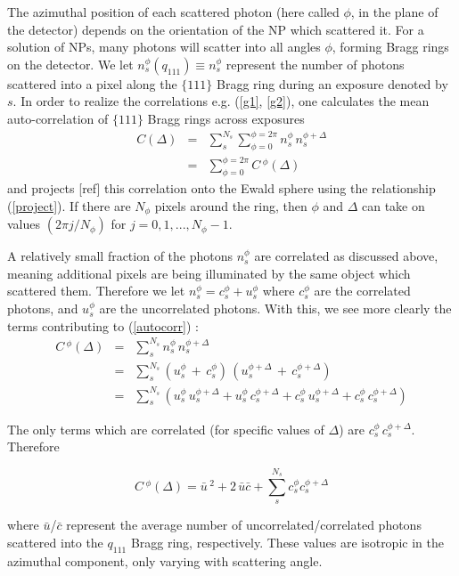 \documentclass [11pt,fleqn]{article}
\def \be {\begin{equation}}
\def \ee {\end{equation}}
\def \beq {\begin{eqnarray}}
\def \eeq {\end{eqnarray}}
\begin{document}
The azimuthal position of each scattered photon (here called $\phi$, in the plane of the detector) depends on the orientation of the NP which scattered it. For a solution of NPs, many photons will scatter into all angles $\phi$, forming Bragg rings on the detector. We let $n_s^\phi (q_{111}) \equiv n_s^\phi$ represent the number of photons scattered into a pixel along the $\{111\}$ Bragg ring during an exposure denoted by $s$. In order to realize the correlations e.g. (\ref{g1}, \ref{g2}), one calculates the mean auto-correlation of $\{111\}$ Bragg rings across exposures
\beq \label{autocorr}
C( \Delta) &=& \sum _s ^ {N_s} \sum_{\phi=0}^{\phi=2\pi} n_s^\phi\, n_s^{\phi + \Delta} \\
&=& \sum_{\phi=0}^{\phi=2\pi} C\,^\phi(\Delta) 
\eeq
and projects [ref] this correlation onto the Ewald sphere using the relationship (\ref{project}). If there are $N_\phi$ pixels around the ring, then $\phi$ and $\Delta$ can take on values $(2\pi j/N_\phi)$ for $j = 0,1,. . . ,N_\phi-1$. 

A relatively small fraction of the photons $n_s^\phi$ are correlated as discussed above, meaning additional pixels are being illuminated by the same object which scattered them. Therefore we let $n_s^\phi = c_s^\phi + u_s^\phi$ where $c_s^\phi$ are the correlated photons, and $u_s^\phi$ are the uncorrelated photons. With this, we see more clearly the terms contributing to  (\ref{autocorr}) :
\beq
C\,^\phi(\Delta) &=& \sum_s^{N_s} n_s^\phi\, n_s^{\phi + \Delta} \\
&=& \sum_s^{N_s} \left( u_s^\phi\,+\,c_s^ \phi \right)\,\left( u_s^{ \phi+\Delta} \,+\, c_s^{\phi+\Delta} \right ) \\
&=& \sum_s^{N_s} \left( u_s^\phi\, u_s^{\phi+\Delta} + u_s^\phi\, c_s^{\phi+\Delta} + c_s^\phi\, u_s^{\phi+\Delta}  +  c_s^\phi\, c_s^{\phi+\Delta} \right )
\eeq

The only terms which are correlated (for specific values of $\Delta$) are $c_s^\phi\,c_s^{\phi+\Delta}$. Therefore

\be \label{cphi2}
C\,^\phi(\Delta) = \bar{u}\,^2 + 2\,\bar{u}\bar{c} + \sum_s^{N_s}c_s^\phi c_s^{\phi + \Delta} 
\ee

where $\bar{u}$/$\bar{c}$ represent the average number of uncorrelated/correlated photons scattered into the $q_{111}$ Bragg ring, respectively. These values are isotropic in the azimuthal component, only varying with scattering angle. 
\end{document}
